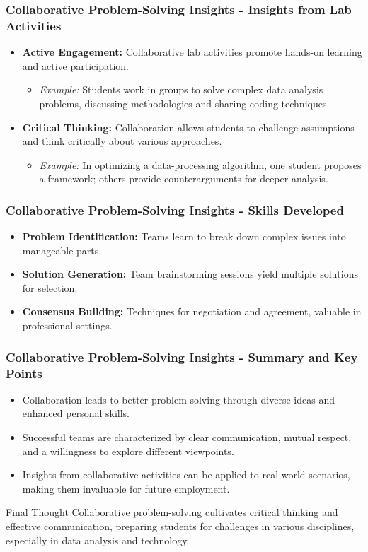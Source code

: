 \documentclass[aspectratio=169]{beamer}
\begin{document}
\begin{frame}[fragile]
    \frametitle{Collaborative Problem-Solving Insights - Insights from Lab Activities}
    \begin{itemize}
        \item \textbf{Active Engagement:} Collaborative lab activities promote hands-on learning and active participation.
            \begin{itemize}
                \item \textit{Example:} Students work in groups to solve complex data analysis problems, discussing methodologies and sharing coding techniques.
            \end{itemize}
        \item \textbf{Critical Thinking:} Collaboration allows students to challenge assumptions and think critically about various approaches.
            \begin{itemize}
                \item \textit{Example:} In optimizing a data-processing algorithm, one student proposes a framework; others provide counterarguments for deeper analysis.
            \end{itemize}
    \end{itemize}
\end{frame}

\begin{frame}[fragile]
    \frametitle{Collaborative Problem-Solving Insights - Skills Developed}
    \begin{itemize}
        \item \textbf{Problem Identification:} Teams learn to break down complex issues into manageable parts.
        \item \textbf{Solution Generation:} Team brainstorming sessions yield multiple solutions for selection.
        \item \textbf{Consensus Building:} Techniques for negotiation and agreement, valuable in professional settings.
    \end{itemize}
\end{frame}

\begin{frame}[fragile]
    \frametitle{Collaborative Problem-Solving Insights - Summary and Key Points}
    \begin{itemize}
        \item Collaboration leads to better problem-solving through diverse ideas and enhanced personal skills.
        \item Successful teams are characterized by clear communication, mutual respect, and a willingness to explore different viewpoints.
        \item Insights from collaborative activities can be applied to real-world scenarios, making them invaluable for future employment.
    \end{itemize}
    \begin{block}{Final Thought}
        Collaborative problem-solving cultivates critical thinking and effective communication, preparing students for challenges in various disciplines, especially in data analysis and technology.
    \end{block}
\end{frame}
\end{document}
